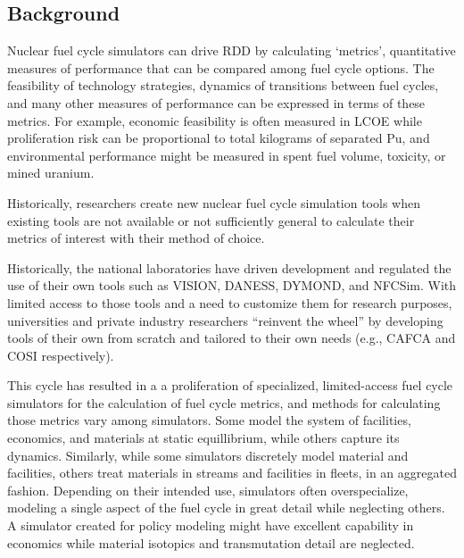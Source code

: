 \subsection{Background}



Nuclear fuel cycle simulators can drive \gls{RDD} by calculating `metrics', 
quantitative measures of performance that 
can be compared among fuel cycle options. The feasibility of technology 
strategies, dynamics of transitions between fuel cycles, and many other 
measures of performance can be expressed in terms of these metrics. For example, 
economic feasibility is often measured in \gls{LCOE} while proliferation risk 
can be proportional to total kilograms of separated Pu, and environmental 
performance might be measured in spent fuel volume, toxicity, or mined uranium.

Historically, researchers create new nuclear fuel cycle simulation tools when 
existing tools are not available or not sufficiently general to calculate their 
metrics of interest with their method of choice.

Historically, the national laboratories have driven development and regulated 
the use of their own tools such as \gls{VISION}\cite{jacobson_verifiable_2010}, 
\gls{DANESS}\cite{van_den_durpel_daness_2009}, 
\gls{DYMOND}\cite{modeling_yacout_2005}, and 
\gls{NFCSim}\cite{schneider_nfcsim:_2005}. With limited access to those tools 
and a need to customize them for research purposes, 
universities and private industry researchers ``reinvent the wheel'' by 
developing tools of their own from scratch and tailored to their own needs (e.g., 
\gls{CAFCA}\cite{guerin_benchmark_2006} and \gls{COSI}\cite{cosi} 
respectively). 

This cycle has resulted in a a proliferation of specialized, limited-access 
fuel cycle simulators for the calculation of fuel cycle metrics, and methods 
for calculating those metrics vary among simulators. Some model the 
system of facilities, economics, and materials at static equillibrium, while 
others capture its dynamics.  
Similarly, while some simulators discretely model material and facilities, 
others treat materials in streams and facilities in fleets, in an aggregated 
fashion. Depending on their intended use, simulators often overspecialize, 
modeling a single aspect of the fuel cycle in great detail while neglecting 
others. A simulator created for policy modeling might have excellent 
capability in economics while material isotopics and transmutation detail are 
neglected.

